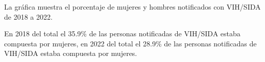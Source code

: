 La gráfica muestra el porcentaje de mujeres y hombres notificados con VIH/SIDA de 2018 a 2022. 

En 2018 del total el 35.9\% de las personas notificadas de VIH/SIDA estaba compuesta por mujeres, en 2022 del total el 28.9\% de las personas notificadas de VIH/SIDA estaba compuesta por mujeres.